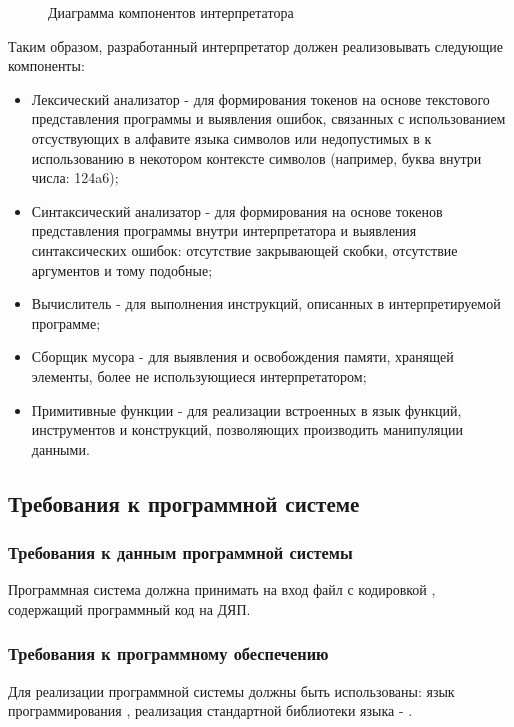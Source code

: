 \begin{figure}[ht]
	\caption{Диаграмма компонентов интерпретатора}
	\label{kompdiagram:image}
\end{figure}

Таким образом, разработанный интерпретатор должен реализовывать следующие компоненты:
\begin{itemize}
	\item Лексический анализатор - для формирования токенов на основе текстового представления программы и выявления ошибок, связанных с использованием отсуствующих в алфавите языка символов или недопустимых в к использованию в некотором контексте символов (например, буква внутри числа: 124a6);
	\item Синтаксический анализатор - для формирования на основе токенов представления программы внутри интерпретатора и выявления синтаксических ошибок: отсутствие закрывающей скобки, отсутствие аргументов и тому подобные;
	\item Вычислитель - для выполнения инструкций, описанных в интерпретируемой программе;
	\item Сборщик мусора - для выявления и освобождения памяти, хранящей элементы, более не использующиеся интерпретатором;
	\item Примитивные функции - для реализации встроенных в язык функций, инструментов и конструкций, позволяющих производить манипуляции данными.
\end{itemize}


\subsection{Требования к программной системе}

\subsubsection{Требования к данным программной системы}
Программная система должна принимать на вход файл с кодировкой , содержащий программный код на ДЯП.

\subsubsection{Требования к программному обеспечению}
Для реализации программной системы должны быть использованы: язык программирования , реализация стандартной библиотеки языка - .

